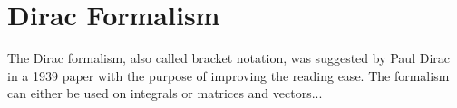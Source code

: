 \chapter{Dirac Formalism}
The Dirac formalism, also called bracket notation, was suggested by Paul Dirac in a 1939 paper with the purpose of improving the reading ease. The formalism can either be used on integrals or matrices and vectors... \cite{dirac_new_1939}